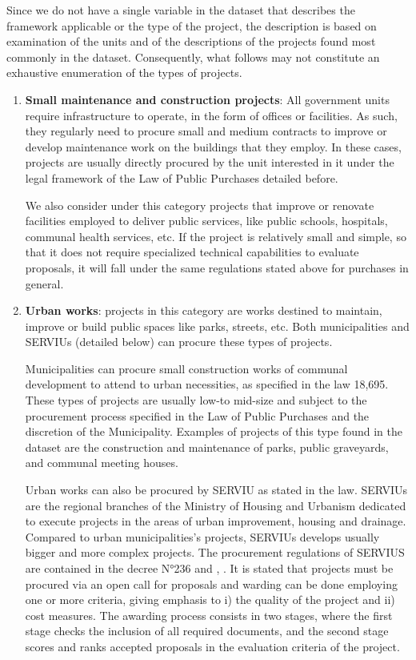 Since we do not have a single variable in the dataset that describes the framework applicable or the type of the project, the description is based on examination of the units and of the descriptions of the projects found most commonly in the dataset. Consequently, what follows may not constitute an exhaustive enumeration of the types of projects.

\begin{enumerate}[wide, labelwidth=!,labelindent=0pt,label=\textbf{\arabic*}.]
\item \textbf{Small maintenance and construction projects}:
All government units require infrastructure to operate, in the form of offices or facilities. As such, they regularly need to procure small and medium contracts to improve or develop maintenance work on the buildings that they employ. In these cases, projects are usually directly procured by the unit interested in it under the legal framework of the Law of Public Purchases detailed before.

We also consider under this category projects that improve or renovate facilities employed to deliver public services, like public schools, hospitals, communal health services, etc. If the project is relatively small and simple, so that it does not require specialized technical capabilities to evaluate proposals, it will fall under the same regulations stated above for purchases in general.

\item \textbf{Urban works}: projects in this category are works destined to maintain, improve or build public spaces like parks, streets, etc. Both municipalities and SERVIUs (detailed below) can procure these types of projects.

Municipalities can procure small construction works of communal development to attend to urban necessities, as specified in the law 18,695. These types of projects are usually low-to mid-size and subject to the procurement process specified in the Law of Public Purchases and the discretion of the Municipality. Examples of projects of this type found in the dataset are the construction and maintenance of parks, public graveyards, and communal meeting houses.

Urban works can also be procured by SERVIU as stated in the law. SERVIUs are the regional branches of the Ministry of Housing and Urbanism dedicated to execute projects in the areas of urban improvement, housing and drainage. Compared to urban municipalities's projects, SERVIUs develops usually bigger and more complex projects. The procurement regulations of SERVIUS are contained in the decree N°236 and , . It is stated that projects must be procured via an open call for proposals and warding can be done employing one or more criteria, giving emphasis to i) the quality of the project and ii) cost measures. The awarding process consists in two stages, where the first stage checks the inclusion of all required documents, and the second stage scores and ranks accepted proposals in the evaluation criteria of the project.


\end{enumerate}
